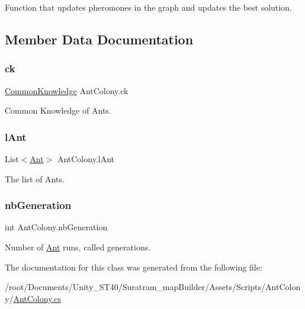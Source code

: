 Function that updates pheromones in the graph and updates the best solution. 



\subsection{Member Data Documentation}
\mbox{\label{classAntColony_a270c695b01a8b559b2e691fafcf090cc}} 
\subsubsection{\texorpdfstring{ck}{ck}}
{\footnotesize\ttfamily \hyperlink{classCommonKnowledge}{Common\+Knowledge} Ant\+Colony.\+ck\hspace{0.3cm}{\ttfamily [private]}}



Common Knowledge of Ants.

\mbox{\label{classAntColony_acd3a0782e201bb61c87c89682859e80b}} 
\subsubsection{\texorpdfstring{l\+Ant}{lAnt}}
{\footnotesize\ttfamily List$<$\hyperlink{classAnt}{Ant}$>$ Ant\+Colony.\+l\+Ant\hspace{0.3cm}{\ttfamily [private]}}



The list of Ants.

\mbox{\label{classAntColony_a8c57e1c9b4292d9efa2b9706c48dc55c}} 
\subsubsection{\texorpdfstring{nb\+Generation}{nbGeneration}}
{\footnotesize\ttfamily int Ant\+Colony.\+nb\+Generation\hspace{0.3cm}{\ttfamily [private]}}



Number of \hyperlink{classAnt}{Ant} runs, called generations.



The documentation for this class was generated from the following file\+:\begin{DoxyCompactItemize}
\item 
/root/\+Documents/\+Unity\+\_\+\+S\+T40/\+Suratram\+\_\+map\+Builder/\+Assets/\+Scripts/\+Ant\+Colony/\hyperlink{AntColony_8cs}{Ant\+Colony.\+cs}\end{DoxyCompactItemize}
